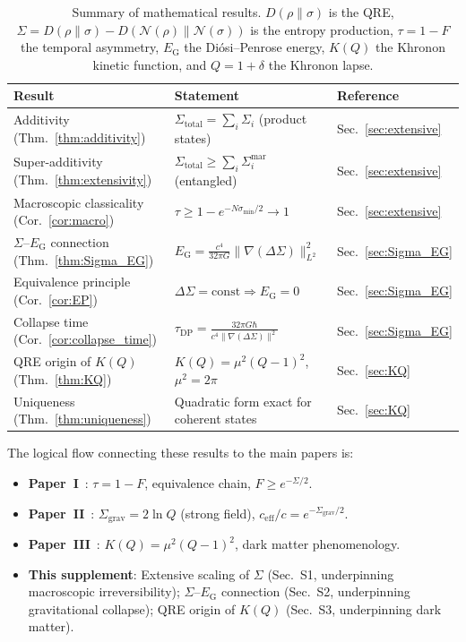 \documentclass[letterpaper,twocolumn,superscriptaddress,longbibliography]{revtex4-2}
\newcommand{\chan}{\mathcal{N}}
\newcommand{\tauasym}{\tau}
\newcommand{\ceff}{c_{\mathrm{eff}}}
\newcommand{\Sgrav}{\Sigma_{\mathrm{grav}}}
\newcommand{\EG}{E_{\mathrm{G}}}
\newcommand{\DSigma}{\Delta\Sigma}
\begin{document}
\begin{table}[t]
\caption{Summary of mathematical results.
$D(\rho\|\sigma)$ is the QRE,
$\Sigma = D(\rho\|\sigma) - D(\chan(\rho)\|\chan(\sigma))$ is the
entropy production, $\tauasym = 1 - F$ the temporal asymmetry,
$\EG$ the Di\'{o}si--Penrose energy, $K(Q)$ the Khronon kinetic
function, and $Q = 1+\delta$ the Khronon lapse.}
\label{tab:summary}
\begin{ruledtabular}
\begin{tabular}{lll}
\textbf{Result} & \textbf{Statement} & \textbf{Reference} \\
\hline
Additivity (Thm.~\ref{thm:additivity})
  & $\Sigma_{\mathrm{total}} = \sum_i \Sigma_i$
    \quad (product states)
  & Sec.~\ref{sec:extensive} \\
Super-additivity (Thm.~\ref{thm:extensivity})
  & $\Sigma_{\mathrm{total}} \geq \sum_i \Sigma_i^{\mathrm{mar}}$
    \quad (entangled)
  & Sec.~\ref{sec:extensive} \\
Macroscopic classicality (Cor.~\ref{cor:macro})
  & $\tauasym \geq 1 - e^{-N\sigma_{\min}/2} \to 1$
  & Sec.~\ref{sec:extensive} \\
$\Sigma$--$\EG$ connection (Thm.~\ref{thm:Sigma_EG})
  & $\EG = \frac{c^4}{32\pi G}\|\nabla(\DSigma)\|^2_{L^2}$
  & Sec.~\ref{sec:Sigma_EG} \\
Equivalence principle (Cor.~\ref{cor:EP})
  & $\DSigma = \mathrm{const} \Rightarrow \EG = 0$
  & Sec.~\ref{sec:Sigma_EG} \\
Collapse time (Cor.~\ref{cor:collapse_time})
  & $\tau_{\mathrm{DP}} = \frac{32\pi G\hbar}
    {c^4\|\nabla(\DSigma)\|^2}$
  & Sec.~\ref{sec:Sigma_EG} \\
QRE origin of $K(Q)$ (Thm.~\ref{thm:KQ})
  & $K(Q) = \mu^2(Q-1)^2$, $\mu^2 = 2\pi$
  & Sec.~\ref{sec:KQ} \\
Uniqueness (Thm.~\ref{thm:uniqueness})
  & Quadratic form exact for coherent states
  & Sec.~\ref{sec:KQ} \\
\end{tabular}
\end{ruledtabular}
\end{table}

The logical flow connecting these results to the main papers is:
\begin{itemize}
  \item \textbf{Paper~I}~\cite{PaperI}: $\tauasym = 1 - F$,
        equivalence chain, $F \geq e^{-\Sigma/2}$.
  \item \textbf{Paper~II}~\cite{PaperII}: $\Sgrav = 2\ln Q$
        (strong field), $\ceff/c = e^{-\Sgrav/2}$.
  \item \textbf{Paper~III}~\cite{PaperIII}: $K(Q) = \mu^2(Q-1)^2$,
        dark matter phenomenology.
  \item \textbf{This supplement}: Extensive scaling of $\Sigma$
        (Sec.~S1, underpinning macroscopic irreversibility);
        $\Sigma$--$\EG$ connection (Sec.~S2, underpinning
        gravitational collapse); QRE origin of $K(Q)$ (Sec.~S3,
        underpinning dark matter).
\end{itemize}
\end{document}

